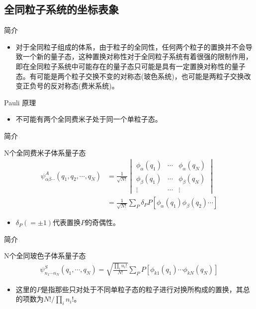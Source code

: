 \documentclass{beamer}
\begin{document}
   \subsection{全同粒子系统的坐标表象}
	\begin{frame}{简介}
	\begin{itemize}
		\item 对于全同粒子组成的体系，由于粒子的全同性，任何两个粒子的置换并不会导致一个新的量子态，这种置换对称性对于全同粒子系统有着很强的限制作用，即在全同粒子系统中可能存在的量子态只可能是具有一定置换对称性的量子态。有可能是两个粒子交换不变的对称态(玻色系统)，也可能是两粒子交换改变正负号的反对称态(费米系统)。
	\end{itemize}
	\begin{block}{Pauli 原理}
		\begin{itemize}
			\item 不可能有两个全同费米子处于同一个单粒子态。
		\end{itemize}
	\end{block}
\end{frame}
\begin{frame}{简介}
	\begin{block}{N个全同费米子体系量子态}
		\begin{equation}
			\begin{aligned}\psi_{\alpha\beta\cdots}^{A}(q_{1},q_{2},\cdots,q_{N})&=\frac{1}{\sqrt{N!}}
				\begin{vmatrix}
					\phi_{\alpha}(q_{1})&\cdots&\phi_{\alpha}(q_{N})\\
					\phi_{\beta}(q_{1})&\cdots&\phi_{\beta}(q_{N})\\
					\vdots&\cdots&\vdots
				\end{vmatrix}\\
				&=\frac{1}{\sqrt{N!}}\sum\limits_{P}\delta_{P}P[\phi_{\alpha}(q_{1})\phi_{\beta}(q_{2})\cdots]
			\end{aligned}
		\end{equation}
	\end{block}
	\begin{itemize}
		\item $\delta_{P}(=\pm 1)$代表置换$P$的奇偶性。
	\end{itemize}
\end{frame}
\begin{frame}{简介}
	\begin{block}{N个全同玻色子体系量子态}
		\begin{equation}
			\begin{aligned}\psi_{n_{1}\cdots n_{N}}^{S}(q_{1},\cdots,q_{N})=\sqrt{\frac{\prod\limits_{i}n_{i}!}{N!}}\sum\limits_{P}P[\phi_{k1}(q_{1})\cdots\phi_{kN}(q_{N})]
			\end{aligned}
		\end{equation}
	\end{block}
	\begin{itemize}
		\item 这里的$P$是指那些只对处于不同单粒子态的粒子进行对换所构成的置换，其总的项数为$N!/\prod\limits_{i}n_{i}!$。
	\end{itemize}
\end{frame}
\end{document}
